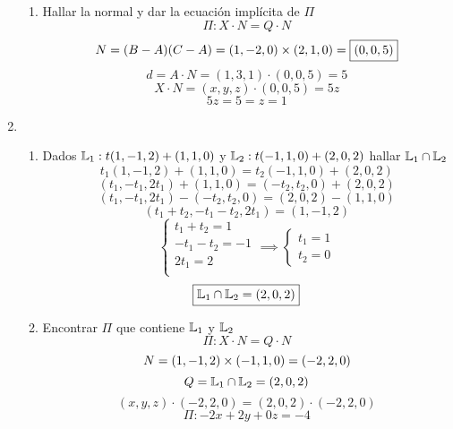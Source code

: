 \documentclass[../practica.root.tex]{subfiles}
\begin{document}
\begin{enumerate}
\begin{enumerate}
              \item Hallar la normal y dar la ecuación implícita de $\Pi$
                    \[ \Pi : X \cdot N = Q \cdot N \]
                    \[ N = (B-A)(C-A) = (1,-2,0)\times(2,1,0) = \boxed{(0, 0, 5)} \]
                    \[ d = A \cdot N = (1, 3, 1)\cdot(0, 0, 5) = 5\]
                    \[ X \cdot N = (x, y, z)\cdot(0, 0, 5) = 5z \]
                    \[ 5z = 5 = \boxed{z = 1} \]

          \end{enumerate}

    \item \begin{enumerate}
              \item Dados $\mathbb{L}_1 : t(1, -1, 2) + (1, 1, 0)$ y $\mathbb{L}_2 : t(-1, 1, 0) + (2, 0, 2)$ hallar $\mathbb{L}_1 \cap \mathbb{L}_2$
                    \[ t_1(1, -1, 2) + (1, 1, 0) = t_2(-1, 1, 0) + (2, 0, 2) \]
                    \[ (t_1, -t_1, 2t_1) + (1, 1, 0) = (-t_2, t_2, 0) + (2, 0, 2) \]
                    \[ (t_1, -t_1, 2t_1) - (-t_2, t_2, 0) = (2, 0, 2) - (1, 1, 0) \]
                    \[ (t_1 + t_2, -t_1 - t_2, 2t_1) = (1, -1, 2) \]
                    \[
                        \begin{cases}
                            t_1 + t_2 = 1   \\
                            -t_1 - t_2 = -1 \\
                            2t_1 = 2        \\
                        \end{cases}
                        \implies
                        \begin{cases}
                            t_1 = 1 \\
                            t_2 = 0
                        \end{cases}
                    \] \[
                        \boxed{\mathbb{L}_1 \cap \mathbb{L}_2 = (2, 0, 2)}
                    \]
              \item Encontrar $\Pi$ que contiene $\mathbb{L}_1$  y $\mathbb{L}_2$
                    \[ \Pi : X \cdot N = Q \cdot N\]
                    \[ N = (1, -1, 2)\times(-1, 1, 0) = (-2, 2, 0) \]
                    \[ Q = \mathbb{L}_1 \cap \mathbb{L}_2 = (2, 0, 2)\]
                    \[ (x, y, z)\cdot(-2, 2, 0) = (2, 0, 2)\cdot(-2, 2, 0) \]
                    \[ \boxed{ \Pi : -2x + 2y + 0z = -4} \]
          \end{enumerate}


\end{enumerate}
\end{document}
